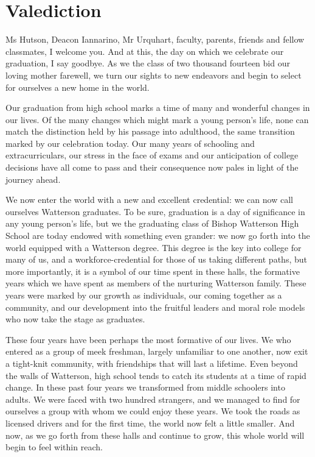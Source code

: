 \documentclass{report}
\begin{document}
\section*{Valediction}

Ms Hutson, Deacon Iannarino, Mr Urquhart, faculty, parents, friends and fellow
classmates, I welcome you. And at this, the day on which we celebrate our
graduation, I say goodbye. As we the class of two thousand fourteen bid our
loving mother farewell, we turn our sights to new endeavors and begin to select
for ourselves a new home in the world.

Our graduation from high school marks a time of many and wonderful changes in
our lives. Of the many changes which might mark a young person's life, none can
match the distinction held by his passage into adulthood, the same transition
marked by our celebration today. Our many years of schooling and
extracurriculars, our stress in the face of exams and our anticipation of
college decisions have all come to pass and their consequence now pales in light
of the journey ahead. 

We now enter the world with a new and excellent credential: we can now call
ourselves Watterson graduates. To be sure, graduation is a day of significance
in any young person's life, but we the graduating class of Bishop Watterson
High School are today endowed with something even grander: we now go forth into
the world equipped with a Watterson degree. This degree is the key into college
for many of us, and a workforce-credential for those of us taking different
paths, but more importantly, it is a symbol of our time spent in these halls,
the formative years which we have spent as members of the nurturing Watterson
family. These years were marked by our growth as individuals, our coming
together as a community, and our development into the fruitful leaders and
moral role models who now take the stage as graduates.

These four years have been perhaps the most formative of our lives. We who
entered as a group of meek freshman, largely unfamiliar to one another, now
exit a tight-knit community, with friendships that will last a lifetime. Even
beyond the walls of Watterson, high school tends to catch its students at a
time of rapid change. In these past four years we transformed from middle
schoolers into adults. We were faced with two hundred strangers, and we managed
to find for ourselves a group with whom we could enjoy these years. We took the
roads as licensed drivers and for the first time, the world now felt a little
smaller. And now, as we go forth from these halls and continue to grow, this
whole world will begin to feel within reach.
\end{document}
